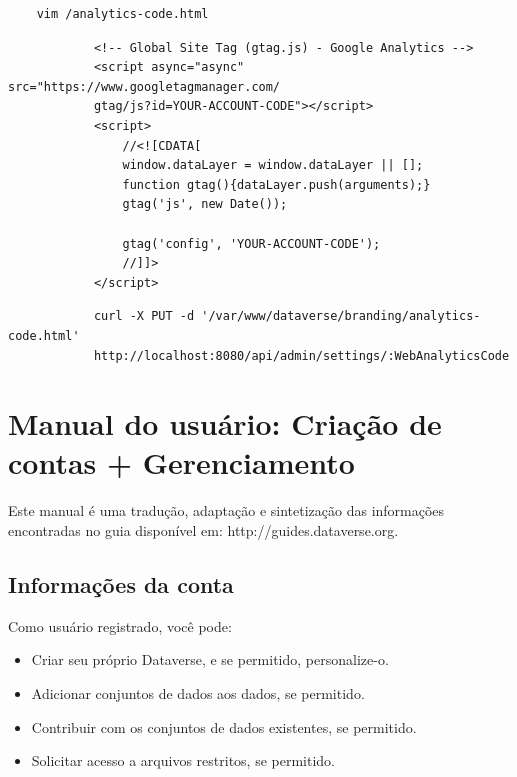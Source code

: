 \documentclass[12pt,hidelinks]{article}
\begin{document}
        
        \begin{verbatim}
    vim /analytics-code.html
        \end{verbatim}
        
        
        \begin{verbatim}
            <!-- Global Site Tag (gtag.js) - Google Analytics -->
            <script async="async" src="https://www.googletagmanager.com/
            gtag/js?id=YOUR-ACCOUNT-CODE"></script>
            <script>
                //<![CDATA[
                window.dataLayer = window.dataLayer || [];
                function gtag(){dataLayer.push(arguments);}
                gtag('js', new Date());
    
                gtag('config', 'YOUR-ACCOUNT-CODE');
                //]]>
            </script>
         \end{verbatim}
    
        \begin{verbatim}
            curl -X PUT -d '/var/www/dataverse/branding/analytics-code.html' 
            http://localhost:8080/api/admin/settings/:WebAnalyticsCode
        \end{verbatim}
        
        
       

        
        \newpage
  
	\vspace{-1.5mm}
\newpage

\section{Manual do usuário: Criação de contas + Gerenciamento}
\vspace{10.5cm}

\qquad Este manual é uma tradução, adaptação e sintetização das informações encontradas no guia disponível em: http://guides.dataverse.org.

	\subsection{Informações da conta}
	
\qquad Como usuário registrado, você pode:

\begin{itemize}
    \item Criar seu próprio Dataverse, e se permitido, personalize-o.
    \item Adicionar conjuntos de dados aos dados, se permitido.
    \item Contribuir com os conjuntos de dados existentes, se permitido.
    \item Solicitar acesso a arquivos restritos, se permitido.
\end{itemize}
     	
\end{document}
